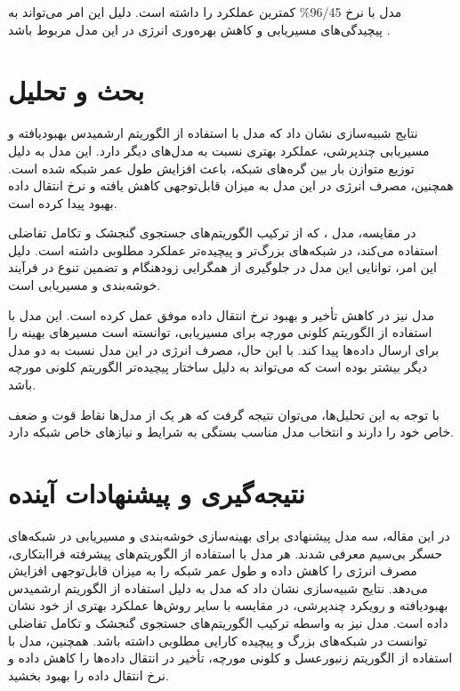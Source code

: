 \documentclass[12pt, onecolumn, a4paper]{article}
\begin{document}
مدل  با نرخ 96/45\% کمترین عملکرد را داشته است. دلیل این امر می‌تواند به پیچیدگی‌های مسیریابی و کاهش بهره‌وری انرژی در این مدل مربوط باشد \cite{ref7}.

\section{بحث و تحلیل}

نتایج شبیه‌سازی نشان داد که مدل  با استفاده از الگوریتم ارشمیدس بهبودیافته و مسیریابی چندپرشی، عملکرد بهتری نسبت به مدل‌های دیگر دارد. این مدل به دلیل توزیع متوازن بار بین گره‌های شبکه، باعث افزایش طول عمر شبکه شده است. همچنین، مصرف انرژی در این مدل به میزان قابل‌توجهی کاهش یافته و نرخ انتقال داده بهبود پیدا کرده است. 

در مقایسه، مدل ، که از ترکیب الگوریتم‌های جستجوی گنجشک و تکامل تفاضلی استفاده می‌کند، در شبکه‌های بزرگ‌تر و پیچیده‌تر عملکرد مطلوبی داشته است. دلیل این امر، توانایی این مدل در جلوگیری از همگرایی زودهنگام و تضمین تنوع در فرآیند خوشه‌بندی و مسیریابی است. 

مدل  نیز در کاهش تأخیر و بهبود نرخ انتقال داده موفق عمل کرده است. این مدل با استفاده از الگوریتم کلونی مورچه برای مسیریابی، توانسته است مسیرهای بهینه را برای ارسال داده‌ها پیدا کند. با این حال، مصرف انرژی در این مدل نسبت به دو مدل دیگر بیشتر بوده است که می‌تواند به دلیل ساختار پیچیده‌تر الگوریتم کلونی مورچه باشد.

با توجه به این تحلیل‌ها، می‌توان نتیجه گرفت که هر یک از مدل‌ها نقاط قوت و ضعف خاص خود را دارند و انتخاب مدل مناسب بستگی به شرایط و نیازهای خاص شبکه دارد.

\section{نتیجه‌گیری و پیشنهادات آینده}

در این مقاله، سه مدل پیشنهادی برای بهینه‌سازی خوشه‌بندی و مسیریابی در شبکه‌های حسگر بی‌سیم معرفی شدند. هر مدل با استفاده از الگوریتم‌های پیشرفته فراابتکاری، مصرف انرژی را کاهش داده و طول عمر شبکه را به میزان قابل‌توجهی افزایش می‌دهد. نتایج شبیه‌سازی نشان داد که مدل  به دلیل استفاده از الگوریتم ارشمیدس بهبودیافته و رویکرد چندپرشی، در مقایسه با سایر روش‌ها عملکرد بهتری از خود نشان داده است. مدل  نیز به واسطه ترکیب الگوریتم‌های جستجوی گنجشک و تکامل تفاضلی توانست در شبکه‌های بزرگ و پیچیده کارایی مطلوبی داشته باشد. همچنین، مدل  با استفاده از الگوریتم زنبورعسل و کلونی مورچه، تأخیر در انتقال داده‌ها را کاهش داده و نرخ انتقال داده را بهبود بخشید.
\end{document}
